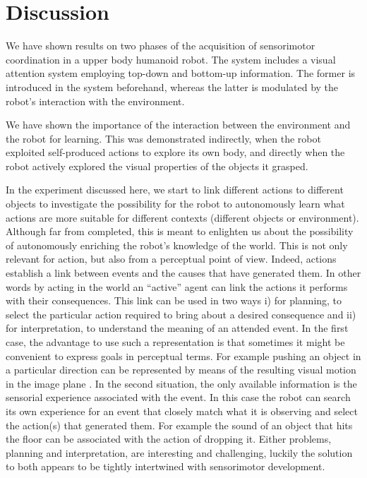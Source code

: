 \section{Discussion}
\label{sect:conclusion}
We have shown results on two phases of the acquisition of sensorimotor coordination in a upper body humanoid robot. The system includes a visual attention system employing top-down and bottom-up information. The former is introduced in the system beforehand, whereas the latter is modulated by the robot's interaction with the environment. 

We have shown the importance of the interaction between the environment and the robot for learning. This was demonstrated indirectly, when the robot exploited self-produced actions to explore its own body, and directly when the robot actively explored the visual properties of the objects it grasped.

In the experiment discussed here, we start to link different actions to different objects to investigate the possibility for the robot to autonomously learn what actions are more suitable for different contexts (different objects or environment). Although far from completed, this is meant to enlighten us about the possibility of autonomously enriching the robot's knowledge of the world. This is not only relevant for action, but also from a perceptual point of view. Indeed, actions establish a link between events and the causes that have generated them. In other words by acting in the world an ``active'' agent can link the actions it performs with their consequences. This link can be used in two ways i) for planning, to select the particular action required to bring about a desired consequence and ii) for interpretation, to understand the meaning of an attended event. In the first case, the advantage to use such a representation is that sometimes it might be convenient to express goals in perceptual terms. For example pushing an object in a particular direction can be represented by means of the resulting visual motion in the image plane \cite{fitzpatrick03learning}.  In the second situation, the only available information is the sensorial experience associated with the event. In this case the robot can search its own experience for an event that closely match what it is observing and select the action(s) that generated them. For example the sound of an object that hits the floor can be associated with the action of dropping it. Either problems, planning and interpretation, are interesting and challenging, luckily the solution to both appears to be tightly intertwined with sensorimotor development.

